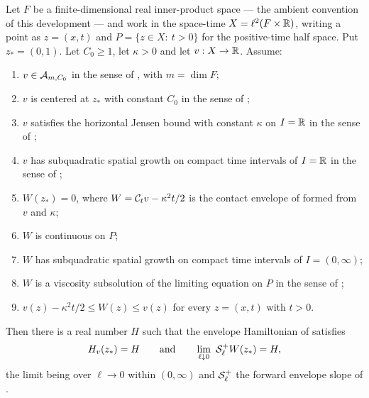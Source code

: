 \begin{lemma}
Let $F$ be a finite-dimensional real inner-product space --- the ambient
convention of this development --- and work in the space-time
$X=\ell^2(F\times\mathbb{R})$, writing a point as $z=(x,t)$ and
$P=\{z\in X:\ t>0\}$ for the positive-time half space. Put $z_*=(0,1)$. Let
$C_0\ge1$, let $\kappa>0$ and let $v:X\to\mathbb{R}$. Assume:
\begin{enumerate}
\item\label{it:cesl-class} $v\in\mathcal{A}_{m,C_0}$ in the sense of
, with $m=\dim F$;
\item\label{it:cesl-cent} $v$ is centered at $z_*$ with constant $C_0$ in the
sense of ;
\item\label{it:cesl-jensen} $v$ satisfies the horizontal Jensen bound with
constant $\kappa$ on $I=\mathbb{R}$ in the sense of ;
\item\label{it:cesl-grow} $v$ has subquadratic spatial growth on compact time
intervals of $I=\mathbb{R}$ in the sense of ;
\item\label{it:cesl-contact} $W(z_*)=0$, where $W=\mathcal{C}_tv-\kappa^2t/2$ is the
contact envelope of  formed from $v$ and $\kappa$;
\item\label{it:cesl-Wcont} $W$ is continuous on $P$;
\item\label{it:cesl-Wgrow} $W$ has subquadratic spatial growth on compact time
intervals of $I=(0,\infty)$;
\item\label{it:cesl-Wsub} $W$ is a viscosity subsolution of the limiting
equation on $P$ in the sense of ;
\item\label{it:cesl-sand} $v(z)-\kappa^2t/2\le W(z)\le v(z)$ for every
$z=(x,t)$ with $t>0$.
\end{enumerate}
Then there is a real number $H$ such that the envelope Hamiltonian of
 satisfies
\[
  H_v(z_*)=H
  \qquad\text{and}\qquad
  \lim_{\ell\downarrow0}\ \mathcal{S}_\ell^+W(z_*)=H ,
\]
the limit being over $\ell\to0$ within $(0,\infty)$ and
$\mathcal{S}_\ell^+$ the forward envelope slope of .
\end{lemma}
